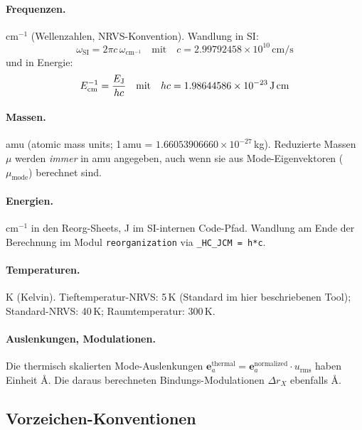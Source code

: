 \documentclass[11pt,a4paper,twoside]{article}
\providecommand{\angstrom}{\text{\AA}}    %
\theoremstyle{remark}
\begin{document}
\paragraph{Frequenzen.}
cm$^{-1}$ (Wellenzahlen, NRVS-Konvention). Wandlung in SI:
\begin{equation}
  \omega_\text{SI} = 2\pi c\,\omega_{\text{cm}^{-1}}
  \quad\text{mit}\quad c = 2.99792458 \times 10^{10}\,\text{cm/s}
\end{equation}
und in Energie:
\begin{equation}
  E_\text{cm}^{-1} = \frac{E_\text{J}}{h c}
  \quad\text{mit}\quad h c = 1.98644586 \times 10^{-23}\,\text{J\,cm}
\end{equation}

\paragraph{Massen.}
amu (atomic mass units; 1\,amu = $1.66053906660 \times 10^{-27}$\,kg).
Reduzierte Massen $\mu$ werden \emph{immer} in amu angegeben, auch
wenn sie aus Mode-Eigenvektoren ($\mu_\text{mode}$) berechnet sind.

\paragraph{Energien.}
cm$^{-1}$ in den Reorg-Sheets, J im SI-internen Code-Pfad. Wandlung
am Ende der Berechnung im Modul \texttt{reorganization} via
\verb|_HC_JCM = h*c|.

\paragraph{Temperaturen.}
K (Kelvin). Tieftemperatur-NRVS: 5\,K (Standard im hier
beschriebenen Tool); Standard-NRVS: 40\,K; Raumtemperatur: 300\,K.

\paragraph{Auslenkungen, Modulationen.}
Die thermisch skalierten Mode-Auslenkungen
$\mathbf{e}_a^\text{thermal} = \mathbf{e}_a^\text{normalized} \cdot
u_\text{rms}$ haben Einheit $\angstrom$. Die daraus berechneten
Bindungs-Modulationen $\Delta r_X$ ebenfalls $\angstrom$.

\subsection{Vorzeichen-Konventionen}
\end{document}
